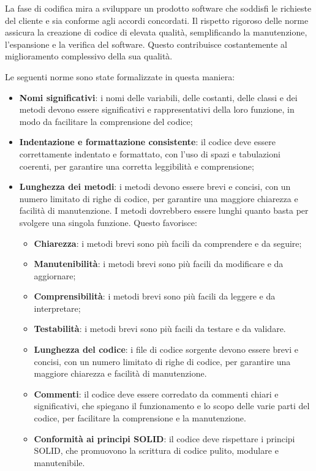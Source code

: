 La fase di codifica mira a sviluppare un prodotto software che soddisfi le richieste del cliente e sia conforme agli accordi concordati. Il rispetto rigoroso delle norme assicura la creazione di codice di elevata qualità, semplificando la manutenzione, l'espansione e la verifica del software. Questo contribuisce costantemente al miglioramento complessivo della sua qualità.

Le seguenti norme sono state formalizzate in questa maniera:
\begin{itemize}
	\item \textbf{Nomi significativi}: i nomi delle variabili, delle costanti, delle classi e dei metodi devono essere significativi e rappresentativi della loro funzione, in modo da facilitare la comprensione del codice;
	\item \textbf{Indentazione e formattazione consistente}: il codice deve essere correttamente indentato e formattato, con l'uso di spazi e tabulazioni coerenti, per garantire una corretta leggibilità e comprensione;
	\item \textbf{Lunghezza dei metodi}: i metodi devono essere brevi e concisi, con un numero limitato di righe di codice, per garantire una maggiore chiarezza e facilità di manutenzione. I metodi dovrebbero essere lunghi quanto basta per svolgere una singola funzione. Questo favorisce:
	      \begin{itemize}
		      \item \textbf{Chiarezza}: i metodi brevi sono più facili da comprendere e da seguire;
		      \item \textbf{Manutenibilità}: i metodi brevi sono più facili da modificare e da aggiornare;
		      \item \textbf{Comprensibilità}: i metodi brevi sono più facili da leggere e da interpretare;
		      \item \textbf{Testabilità}: i metodi brevi sono più facili da testare e da validare.
		      \item \textbf{Lunghezza del codice}: i file di codice sorgente devono essere brevi e concisi, con un numero limitato di righe di codice, per garantire una maggiore chiarezza e facilità di manutenzione.
		      \item \textbf{Commenti}: il codice deve essere corredato da commenti chiari e significativi, che spiegano il funzionamento e lo scopo delle varie parti del codice, per facilitare la comprensione e la manutenzione.
		      \item \textbf{Conformità ai principi SOLID}: il codice deve rispettare i principi SOLID, che promuovono la scrittura di codice pulito, modulare e manutenibile.
	      \end{itemize}
\end{itemize}


